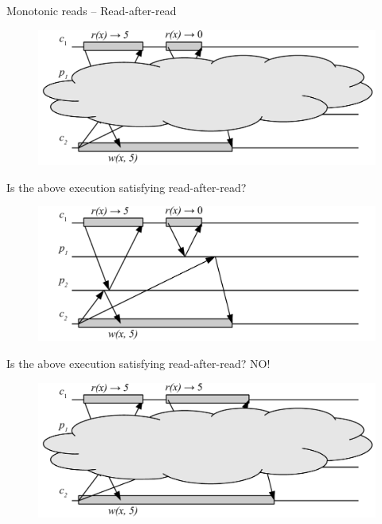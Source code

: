 \begin{frame}{Monotonic reads -- Read-after-read}

\begin{overprint}
\begin{figure}
	\includegraphics[width=\textwidth]{read-after-read-01}
\end{figure}
\BI
\item Is the above execution satisfying read-after-read?
\EI
{}
\begin{figure}
	\includegraphics[width=\textwidth]{read-after-read-01n}
\end{figure}
\BI
\item Is the above execution satisfying read-after-read? \quad NO!
\EI
{}
\begin{figure}
	\includegraphics[width=\textwidth]{read-after-read-02}
\end{figure}

\end{overprint}
\end{frame}
